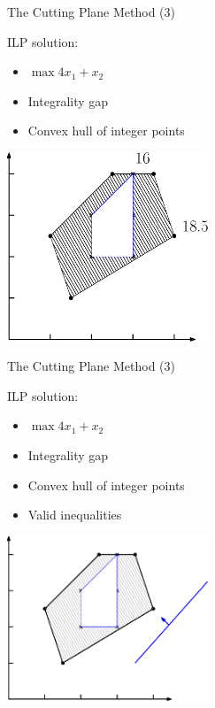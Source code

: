 \documentclass[10pt]{beamer}
\begin{document}
\begin{frame}[t]{The Cutting Plane Method (3)}
        \begin{minipage}[t]{0.48\textwidth}
            ILP solution:
            \begin{itemize}
                \item \alert{$ \max 4x_1 + x_2 $}
                \item Integrality gap
                \item Convex hull of integer points
            \end{itemize}
        \end{minipage}
        \begin{minipage}[t]{0.48\textwidth}
            \begin{center}
                \includegraphics[width=6cm]{cutting_plane009.eps} 
            \end{center}
        \end{minipage}        
\end{frame}

\begin{frame}[t]{The Cutting Plane Method (3)}
        \begin{minipage}[t]{0.48\textwidth}
            ILP solution:
            \begin{itemize}
                \item \alert{$ \max 4x_1 + x_2 $}
                \item Integrality gap
                \item Convex hull of integer points
                \item Valid inequalities
            \end{itemize}
        \end{minipage}
        \begin{minipage}[t]{0.48\textwidth}
            \begin{center}
                \includegraphics[width=6cm]{cutting_plane010.eps} 
            \end{center}
        \end{minipage}        
\end{frame}
\end{document}
